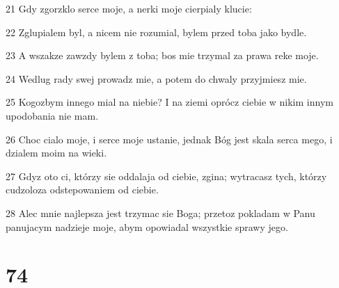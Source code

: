 \par 21 Gdy zgorzklo serce moje, a nerki moje cierpialy klucie:
\par 22 Zglupialem byl, a nicem nie rozumial, bylem przed toba jako bydle.
\par 23 A wszakze zawzdy bylem z toba; bos mie trzymal za prawa reke moje.
\par 24 Wedlug rady swej prowadz mie, a potem do chwaly przyjmiesz mie.
\par 25 Kogozbym innego mial na niebie? I na ziemi oprócz ciebie w nikim innym upodobania nie mam.
\par 26 Choc cialo moje, i serce moje ustanie, jednak Bóg jest skala serca mego, i dzialem moim na wieki.
\par 27 Gdyz oto ci, którzy sie oddalaja od ciebie, zgina; wytracasz tych, którzy cudzoloza odstepowaniem od ciebie.
\par 28 Alec mnie najlepsza jest trzymac sie Boga; przetoz pokladam w Panu panujacym nadzieje moje, abym opowiadal wszystkie sprawy jego.

\chapter{74}

